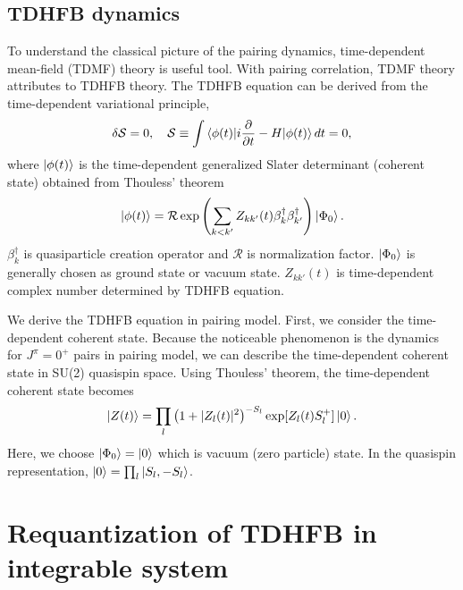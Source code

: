 \documentclass[11pt]{book} %
\begin{document}
\section{TDHFB dynamics}
To understand the classical picture of the pairing dynamics, time-dependent mean-field (TDMF) theory is useful tool. With pairing correlation, TDMF theory attributes to TDHFB theory.
The TDHFB equation can be derived from the time-dependent variational principle,
\begin{equation}
  \delta\mathcal{S}=0, \quad 
  \mathcal{S} \equiv \int \braket{\phi(t)|i\frac{\partial}{\partial t}-H|\phi(t)}dt = 0 ,
\end{equation}
where $\ket{\phi(t)}$ is the time-dependent generalized Slater determinant (coherent state) obtained from Thouless' theorem
\begin{equation}
  \ket{\phi(t)} = \mathcal{R}\exp{\left( \sum_{k<k'}Z_{kk'}(t)\beta_k^{\dag}\beta_{k'}^{\dag}
    \right)}\ket{\Phi_0} .
\end{equation}
$\beta_k^{\dag}$ is quasiparticle creation operator and $\mathcal{R}$ is normalization factor. $\ket{\Phi_0}$ is generally chosen as ground state or vacuum state. $Z_{kk'}(t)$ is time-dependent complex number determined by TDHFB equation.\par
We derive the TDHFB equation in pairing model. First, we consider the time-dependent coherent state. Because the noticeable phenomenon is the dynamics for $J^{\pi}=0^+$ pairs in pairing model, we can describe the time-dependent coherent state in SU(2) quasispin space. Using Thouless' theorem, the time-dependent coherent state becomes
\begin{equation}
	\ket{Z(t)} = \prod_{l} \left(1+|Z_l(t)|^2\right)^{-S_l}
	\exp [Z_l(t) S_l^{+}] \ket{0} .
 \label{coherent}
\end{equation}
Here, we choose $\ket{\Phi_0}=\ket{0}$ which is vacuum (zero particle) state. In the quasispin representation, $\ket{0}=\prod_l \ket{S_l,-S_l}$.



\chapter{Requantization of TDHFB in integrable system}
\end{document}
